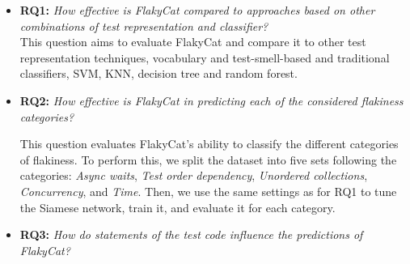\begin{itemize}[label={}]
\item \textbf{\textsc{RQ1:}} \emph{How effective is FlakyCat compared to approaches based on other combinations of test representation and classifier?}\\

This question aims to evaluate FlakyCat and compare it to other test representation techniques, \ie vocabulary and test-smell-based and traditional classifiers, \ie SVM, KNN, decision tree and random forest.

\item \textbf{\textsc{RQ2:}} \emph{How effective is FlakyCat in predicting each of the considered flakiness categories?}

This question evaluates FlakyCat's ability to classify the different categories of flakiness.
To perform this, we split the dataset into five sets following the categories: \textit{Async waits}, \textit{Test order dependency},  \textit{Unordered collections}, \textit{Concurrency}, and \textit{Time}.
Then, we use the same settings as for RQ1 to tune the Siamese network, train it, and evaluate it for each category.

\item \textbf{\textsc{RQ3:}} \emph{ How do statements of the test code influence the predictions of FlakyCat?}



\end{itemize}
